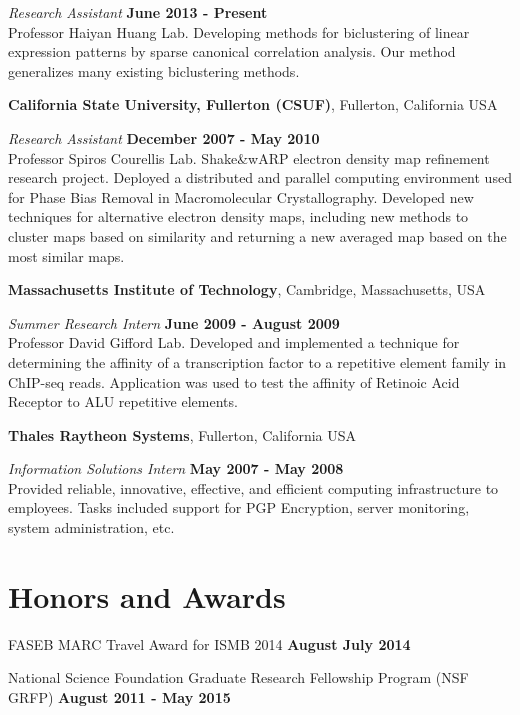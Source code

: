 \documentclass[margin,line]{res}
\begin{document}
\begin{resume}
{\em Research Assistant} \hfill {\bf June 2013 - Present}\\
Professor Haiyan Huang Lab. Developing methods for biclustering of linear
expression patterns by sparse canonical correlation analysis. Our method
generalizes many existing biclustering methods.

{\bf California State University, Fullerton (CSUF)}, Fullerton, California USA
\vspace{-.3cm}

{\em Research Assistant} \hfill {\bf December 2007 - May 2010}\\
Professor Spiros Courellis Lab. Shake\&wARP electron density map refinement
research project. Deployed a distributed and parallel computing environment used
for Phase Bias Removal in Macromolecular Crystallography. Developed new
techniques for alternative electron density maps, including new methods to
cluster maps based on similarity and returning a new averaged map based on the
most similar maps.

\newpage

{\bf Massachusetts Institute of Technology}, Cambridge, Massachusetts,
USA

\vspace{-.3cm}
{\em Summer Research Intern} \hfill {\bf June 2009 - August 2009}\\
Professor David Gifford Lab. Developed and implemented a technique for
determining the affinity of a transcription factor to a repetitive element
family in ChIP-seq reads. Application was used to test the affinity of Retinoic
Acid Receptor to ALU repetitive elements.

{\bf Thales Raytheon Systems}, Fullerton, California USA

\vspace{-.3cm}
{\em Information Solutions Intern} \hfill {\bf May 2007 - May 2008}\\
Provided reliable, innovative, effective, and efficient computing infrastructure
to employees. Tasks included support for PGP Encryption, server monitoring,
system administration, etc.


\section{\sc Honors and Awards}
FASEB MARC Travel Award for ISMB 2014 \hfill {\bf August
  July 2014}

National Science Foundation Graduate Research Fellowship Program (NSF GRFP)
\hfill {\bf August 2011 - May 2015}


\end{resume}
\end{document}
